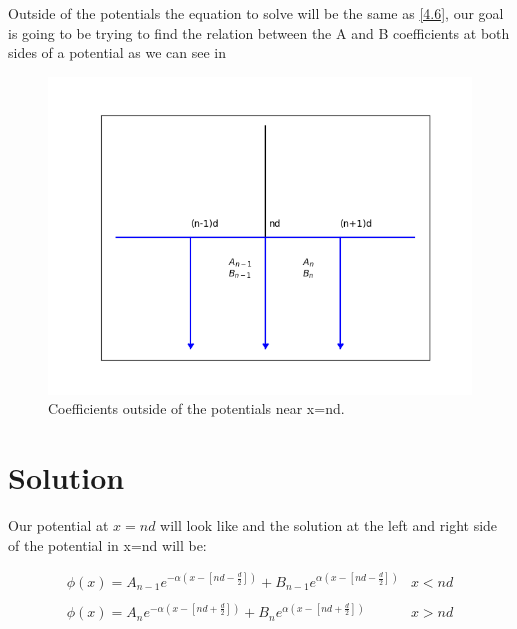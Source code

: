 Outside of the potentials the equation to solve will be the same as \ref{4.6}, our goal is going to be trying to find the relation between the A and B coefficients at both sides of a potential as we can see in 

\begin{figure}[H]
  \includegraphics{images5/def_n.png}
  \centering
  \caption{Coefficients outside of the potentials near x=nd.}
\end{figure}

\section{Solution}

Our potential at $x=nd$ will look like  and the solution at the left and right side of the potential in x=nd will be: 


\begin{equation}
  \label{5.3}
  \begin{array}{lc}
    \phi(x) = A_{n-1}e^{-\alpha(x-[nd-\frac{d}{2}])}+B_{n-1}e^{\alpha(x-[nd-\frac{d}{2}])} & x < nd
    \\

    \\
    \phi(x) = A_{n}e^{-\alpha(x-[nd+\frac{d}{2}])}+B_{n}e^{\alpha(x-[nd+\frac{d}{2}])} & x > nd
  \end{array}
\end{equation}



